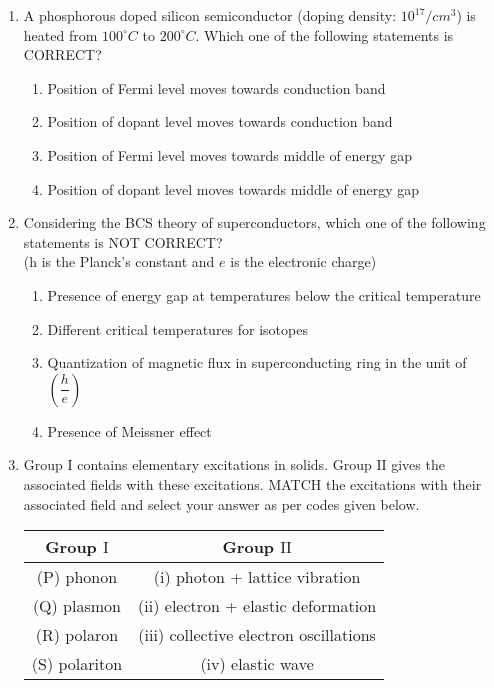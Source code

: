 \documentclass[journal]{IEEEtran}
\theoremstyle{remark}
\begin{document}
\begin{enumerate}
\item A phosphorous doped silicon semiconductor (doping density: $10^{17}/cm^3$) is heated from $100^\circ C$ to $200^\circ C$. Which one of the following statements is CORRECT? 

\begin{enumerate}
    \item Position of Fermi level moves towards conduction band
    \item Position of dopant level moves towards conduction band
    \item Position of Fermi level moves towards middle of energy gap
    \item Position of dopant level moves towards middle of energy gap
\end{enumerate}

\item Considering the BCS theory of superconductors, which one of the following statements is NOT CORRECT?\\
(h is the Planck's constant and $e$ is the electronic charge)

\begin{enumerate}
    \item Presence of energy gap at temperatures below the critical temperature
    \item Different critical temperatures for isotopes
    \item Quantization of magnetic flux in superconducting ring in the unit of $\left(\dfrac{h}{e}\right)$
    \item Presence of Meissner effect
\end{enumerate}

\item Group $\mathrm{I}$ contains elementary excitations in solids. Group $\mathrm{II}$ gives the associated fields with these excitations. MATCH the excitations with their associated field and select your answer as per codes given below.

\begin{tabular}{|c|c|} 
\hline
Group $\mathrm{I}$ & Group $\mathrm{II}$ \\
\hline
(P) phonon & (i) photon + lattice vibration \\
\hline
(Q) plasmon & (ii) electron + elastic deformation \\
\hline
(R) polaron & (iii) collective electron oscillations \\
\hline
(S) polariton & (iv) elastic wave \\
\hline
\end{tabular} \\


\end{enumerate}
\end{document}
